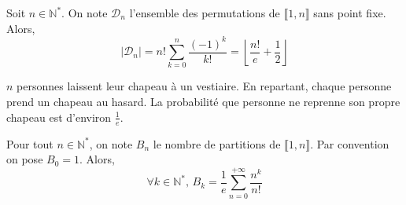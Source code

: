 	\begin{theorem}[Dérangements]
		Soit $n \in \mathbb{N}^*$. On note $\mathcal{D}_n$ l'ensemble des permutations de $\llbracket 1, n \rrbracket$ sans point fixe. Alors,
		\[ \vert \mathcal{D}_n \vert = n! \sum_{k=0}^{n} \frac{(-1)^k}{k!} = \left\lfloor \frac{n!}{e} + \frac{1}{2} \right\rfloor \]
	\end{theorem}
	
	\begin{example}
		$n$ personnes laissent leur chapeau à un vestiaire. En repartant, chaque personne prend un chapeau au hasard. La probabilité que personne ne reprenne son propre chapeau est d'environ $\frac{1}{e}$.
	\end{example}
	
	
	\begin{theorem}
		Pour tout $n \in \mathbb{N}^*$, on note $B_n$ le nombre de partitions de $\llbracket 1, n \rrbracket$. Par convention on pose $B_0 = 1$. Alors,
		\[ \forall k \in \mathbb{N}^*, \, B_k = \frac{1}{e} \sum_{n=0}^{+\infty} \frac{n^k}{n!} \]
	\end{theorem}

